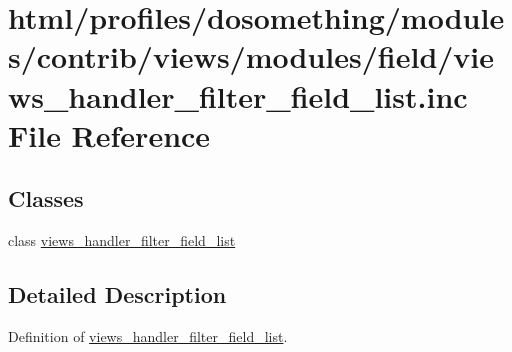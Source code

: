 \hypertarget{views__handler__filter__field__list_8inc}{
\section{html/profiles/dosomething/modules/contrib/views/modules/field/views\_\-handler\_\-filter\_\-field\_\-list.inc File Reference}
\label{views__handler__filter__field__list_8inc}
}
\subsection*{Classes}
\begin{DoxyCompactItemize}
\item 
class \hyperlink{classviews__handler__filter__field__list}{views\_\-handler\_\-filter\_\-field\_\-list}
\end{DoxyCompactItemize}


\subsection{Detailed Description}
Definition of \hyperlink{classviews__handler__filter__field__list}{views\_\-handler\_\-filter\_\-field\_\-list}. 